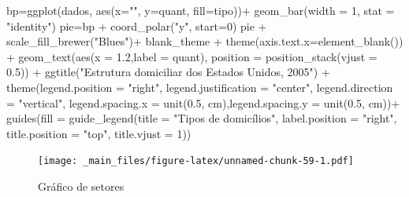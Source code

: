 \documentclass[
]{book}
\newenvironment{Shaded}{\begin{snugshade}}{\end{snugshade}}
\newcommand{\AttributeTok}[1]{\textcolor[rgb]{0.77,0.63,0.00}{#1}}
\newcommand{\DecValTok}[1]{\textcolor[rgb]{0.00,0.00,0.81}{#1}}
\newcommand{\FloatTok}[1]{\textcolor[rgb]{0.00,0.00,0.81}{#1}}
\newcommand{\FunctionTok}[1]{\textcolor[rgb]{0.00,0.00,0.00}{#1}}
\newcommand{\NormalTok}[1]{#1}
\newcommand{\OtherTok}[1]{\textcolor[rgb]{0.56,0.35,0.01}{#1}}
\newcommand{\SpecialCharTok}[1]{\textcolor[rgb]{0.00,0.00,0.00}{#1}}
\newcommand{\StringTok}[1]{\textcolor[rgb]{0.31,0.60,0.02}{#1}}
\begin{document}
\begin{Shaded}
\begin{Highlighting}[]
\NormalTok{bp}\OtherTok{=}\FunctionTok{ggplot}\NormalTok{(dados, }\FunctionTok{aes}\NormalTok{(}\AttributeTok{x=}\StringTok{""}\NormalTok{, }\AttributeTok{y=}\NormalTok{quant, }\AttributeTok{fill=}\NormalTok{tipo))}\SpecialCharTok{+}
  \FunctionTok{geom\_bar}\NormalTok{(}\AttributeTok{width =} \DecValTok{1}\NormalTok{, }\AttributeTok{stat =} \StringTok{"identity"}\NormalTok{)}
\NormalTok{pie}\OtherTok{=}\NormalTok{bp }\SpecialCharTok{+} \FunctionTok{coord\_polar}\NormalTok{(}\StringTok{"y"}\NormalTok{, }\AttributeTok{start=}\DecValTok{0}\NormalTok{)}
\NormalTok{pie }\SpecialCharTok{+} 
  \FunctionTok{scale\_fill\_brewer}\NormalTok{(}\StringTok{"Blues"}\NormalTok{)}\SpecialCharTok{+}
\NormalTok{  blank\_theme }\SpecialCharTok{+}
  \FunctionTok{theme}\NormalTok{(}\AttributeTok{axis.text.x=}\FunctionTok{element\_blank}\NormalTok{()) }\SpecialCharTok{+}
  \FunctionTok{geom\_text}\NormalTok{(}\FunctionTok{aes}\NormalTok{(}\AttributeTok{x =}  \FloatTok{1.2}\NormalTok{,}\AttributeTok{label =}\NormalTok{ quant), }\AttributeTok{position =} \FunctionTok{position\_stack}\NormalTok{(}\AttributeTok{vjust =} \FloatTok{0.5}\NormalTok{)) }\SpecialCharTok{+}
  \FunctionTok{ggtitle}\NormalTok{(}\StringTok{"Estrutura domiciliar dos Estados Unidos, 2005"}\NormalTok{) }\SpecialCharTok{+}
  \FunctionTok{theme}\NormalTok{(}\AttributeTok{legend.position =} \StringTok{"right"}\NormalTok{, }\AttributeTok{legend.justification =} \StringTok{"center"}\NormalTok{, }\AttributeTok{legend.direction =} \StringTok{"vertical"}\NormalTok{,}
        \AttributeTok{legend.spacing.x =} \FunctionTok{unit}\NormalTok{(}\FloatTok{0.5}\NormalTok{, }\StringTok{\textquotesingle{}cm\textquotesingle{}}\NormalTok{),}\AttributeTok{legend.spacing.y =} \FunctionTok{unit}\NormalTok{(}\FloatTok{0.5}\NormalTok{, }\StringTok{\textquotesingle{}cm\textquotesingle{}}\NormalTok{))}\SpecialCharTok{+}
  \FunctionTok{guides}\NormalTok{(}\AttributeTok{fill =} \FunctionTok{guide\_legend}\NormalTok{(}\AttributeTok{title =} \StringTok{"Tipos de domicílios"}\NormalTok{,}
                             \AttributeTok{label.position =} \StringTok{"right"}\NormalTok{,}
                             \AttributeTok{title.position =} \StringTok{"top"}\NormalTok{, }\AttributeTok{title.vjust =} \DecValTok{1}\NormalTok{)) }
\end{Highlighting}
\end{Shaded}

\begin{figure}
\centering
\texttt{[image: \_main\_files/figure-latex/unnamed-chunk-59-1.pdf]}
\caption{\label{fig:unnamed-chunk-59}Gráfico de setores}
\end{figure}
\end{document}
